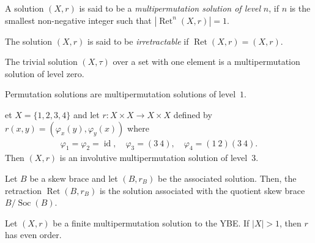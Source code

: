 \begin{definition}
     A solution $(X,r)$ is said to be a \emph{multipermutation solution of level} $n$, if $n$ is the smallest non-negative integer such that $|\operatorname{Ret}^{n}(X,r)| = 1$. 
\end{definition}
  
    
\begin{definition}
    The solution $(X,r)$ is said to be \emph{irretractable} if $\operatorname{Ret}(X,r)=(X,r)$. 
\end{definition}

\begin{example}
    The trivial solution $(X,\tau)$ over a set with one element is a multipermutation solution of level zero.
\end{example}

\begin{example}
    Permutation solutions are multipermutation solutions of level~$1$.
\end{example}

\begin{example}
    et $X=\{1,2,3,4\}$ and let $r:X\times X\to X \times X$ defined by $r(x,y)=(\varphi_x(y),\varphi_y(x))$ where
        \begin{align*}
            \varphi_1=\varphi_2=\operatorname{id}, \quad \varphi_3=(3\ 4), \quad \varphi_4=(1\ 2)(3\ 4).
        \end{align*}
        Then $(X,r)$ is an involutive multipermutation solution of level~$3$.
\end{example}



\begin{proposition}
    Let $B$ be a skew brace and let $(B,r_B)$ be the associated solution. Then, the retraction $\operatorname{Ret}(B,r_B)$ is the solution associated with the quotient skew brace $B/\operatorname{Soc}(B)$.
\end{proposition}


\begin{theorem}\label{thm:ordermultipermutiation}
    Let $(X,r)$ be a finite multipermutation solution to the YBE. If $|X|>1$, then $r$ has even order. 
\end{theorem}


